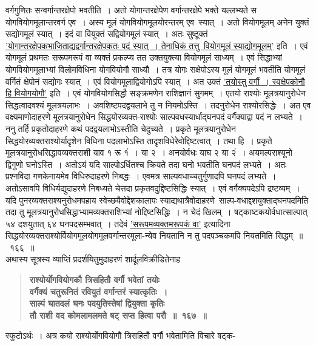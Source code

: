 \documentclass[11pt, openany]{book}
\begin{document}
\begin{sloppypar}
\noindent वर्गगुणितः सन्वर्गान्तरक्षेपो भवतीति~। अतो योगान्तरक्षेपेण वर्गान्तरक्षेपे भक्ते यल्लभ्यते स योगवियोगमूलान्तरवर्ग एव~। अस्य मूलं योगवियोगमूलयोरन्तरम् एव~स्यात्~। अतो वियोगमूलम् अनेन युक्तं सद्योगमूलं स्यात्~। इदं वा वियुक्तं सद्वियोगमूलं स्यात्~। अतः सुष्ठूक्तं \hyperref[10.166]{'योगान्तरक्षेपकभाजिताद्यद्वर्गान्तरक्षेपकतः पदं स्यात्~। तेनाधिकं तत्तु~वियोगमूलं स्याद्योगमूलम्'} इति~। एवं योगमूलं प्रथमतः सरूपमरूपं वा व्यक्तं प्रकल्प्य तत उक्तयुक्त्या वियोगमूलं साध्यम्~। एवं सिद्धाभ्यां योगवियोगमूलाभ्यां विलोमविधिना योगवियोगौ साध्यौ~। तत्र योगः सक्षेपोऽस्य मूलं योगमूलं भवतीति योगमूलं वर्गितं क्षेपोनं सद्योगः स्यात्~। एवं वियोगमूलाद्वियोगोऽपि स्यात्~। अत उक्तं \hyperref[10.166]{'तयोस्तु वर्गौ~। स्वक्षेपकोनौ हि वियोगयोगौ'} इति~। एवं योगवियोगसिद्धौ सङ्क्रमणेन राशिज्ञानं सुगमम्~। एतयो राश्योः मूलत्रयानुरोधेन सिद्धत्वादवश्यं मूलत्रयलाभः~। अवशिष्टपदद्वयलाभे तु न नियमोऽस्ति~। तदनुरोधेन राश्योरसिद्धेः~। अत एव वक्ष्यमाणोदाहरणे मूलत्रयानुरोधेन सिद्धयोरव्यक्त-राश्योः साल्पवधस्यार्धाद्घनपदं वर्गैक्याद्वा पदं न लभ्यते~।\\

ननु तर्हि प्रकृतोदाहरणे कथं पदद्वयलाभोऽस्तीति चेदुच्यते~। प्रकृते मूलत्रयानुरोधेन सिद्धयोरव्यक्तराश्योर्यादृशेन विधिना पदलाभोऽस्ति तादृशविधेरेवोद्दिष्टत्वात्~। तथा हि~। प्रकृते मूलत्रयानुरोधसिद्धावव्यक्तराशी याव १ रू १ं~। या २~। अनयोर्वधः याघ २ या २ं~। अयमल्पराश्यूनो द्विगुणो घनोऽस्ति~। अतोऽयं यदि साल्पोऽर्धितश्च क्रियते तदा घनो भवतीति घनपदं लभ्यते~। अतः प्रश्नविदा गणकेनायमेव विधिरुदाहरणे निबद्धः~। एवमत्र साल्पवधाच्चतुर्गुणादपि घनपदं लभ्यते~। अतोऽसावपि विधिर्यद्युदाहरणे निबध्यते चेत्तदा प्रकृतवदुद्दिष्टसिद्धिः स्यात्~। एवं वर्गैक्यपदेऽपि द्रष्टव्यम्~।\\

यदि पुनरव्यक्तराश्यनुरोधमपहाय स्वेच्छयैवोद्देशकालापः स्याद्यथात्रैवोदाहरणे~साल्प-वधाद्दशयुक्ताद्घनपदमिति तदा तु मूलत्रयानुरोधसिद्धाभ्यामव्यक्तराशिभ्यां नोद्दिष्टसिद्धिः~। न चेदं खिलम्~। षट्काष्टकयोर्वधात्साल्पात् ५४ दशयुतात् ६४ घनपदसम्भवात्~। तदेवं \hyperref[10.166]{'सरूपमव्यक्तमरूपकं वा'} इत्यादिना सिद्धयोरव्यक्तराश्योर्वियोगमूलयोगमूलवर्गान्तरमूला-न्येव नियतानि न तु पदपञ्चकमपि नियतमिति सिद्धम्~॥~१६६~॥\\

{\small अथास्य सूत्रस्य व्याप्तिं प्रदर्शयितुमुदाहरणं शार्दूलविक्रीडितेनाह\textendash }

 \label{10.167}
\begin{quote}
{\large \textbf{{\color{purple}राश्योर्योगवियोगकौ त्रिसहितौ वर्गौ भवेतां तयोः \\
वर्गैक्यं चतुरूनितं रवियुतं वर्गान्तरं स्यात्कृतिः~।\\
साल्पं घातदलं घनः पदयुतिस्तेषां द्वियुक्ता कृतिः\\
तौ राशी वद कोमलामलमते षट् सप्त हित्वा परौ~॥~१६७~॥}}}
\end{quote}

स्फुटोऽर्थः~। अत्र कयो राश्योर्योगवियोगौ त्रिसहितौ वर्गौ भवेतामिति विचारे षट्क-

\end{sloppypar}
\end{document}
